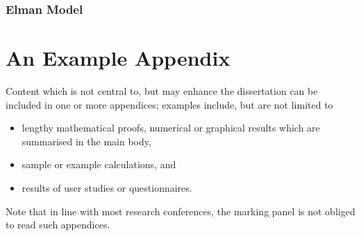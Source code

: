\documentclass[ author={Stephen Livermore-Tozer},
				supervisor={Dr. Peter Flach},
				degree={MEng},
				title={Algorithmic Co-composition Using Machine Learning},
				subtitle={},
				type={research},
				year={2016} ]{dissertation}
\begin{document}
	
	
	\subsection{Elman Model}
	


	\backmatter
	
	
	
	\appendix
	
	\chapter{An Example Appendix}
	\label{appx:example}
	
	Content which is not central to, but may enhance the dissertation can be 
	included in one or more appendices; examples include, but are not limited
	to
	
	\begin{itemize}
		\item lengthy mathematical proofs, numerical or graphical results which 
		are summarised in the main body,
		\item sample or example calculations, 
		and
		\item results of user studies or questionnaires.
	\end{itemize}
	
	\noindent
	Note that in line with most research conferences, the marking panel is not
	obliged to read such appendices.
	
	
\end{document}
